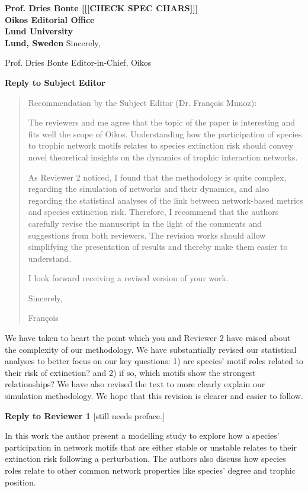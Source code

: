 \documentclass[12pt]{letter}
\begin{document}
\begin{letter}{\bf Prof. Dries Bonte [[[CHECK SPEC CHARS]]]\\
Oikos Editorial Office \\
Lund University \\
Lund, Sweden}
Sincerely,

Prof. Dries Bonte
Editor-in-Chief, Oikos




\clearpage

\Large{\textbf{Reply to Subject Editor}}

    
    \begin{quotation}    
  Recommendation by the Subject Editor (Dr. François Munoz):

  The reviewers and me agree that the topic of the paper is interesting and fits well the scope of Oikos.
  Understanding how the participation of species to trophic network motifs relates to species extinction risk should convey novel theoretical insights on the dynamics of trophic interaction networks.

  As Reviewer 2 noticed, I found that the methodology is quite complex, regarding the simulation of networks and their dynamics, and also regarding the statistical analyses of the link between network-based metrics and species extinction risk.
  Therefore, I recommend that the authors carefully revise the manuscript in the light of the comments and suggestions from both reviewers. The revision works should allow simplifying the presentation of results and thereby make them easier to understand.

  I look forward receiving a revised version of your work.

  Sincerely,

  François
  \end{quotation}
  
  We have taken to heart the point which you and Reviewer 2 have raised about the complexity of our methodology. We have substantially revised our statistical analyses to better focus on our key questions: 1) are species' motif roles related to their risk of extinction? and 2) if so, which motifs show the strongest relationships? We have also revised the text to more clearly explain our simulation methodology. We hope that this revision is clearer and easier to follow.

\clearpage

\Large{\textbf{Reply to Reviewer 1}} [still needs preface.]

  In this work the author present a modelling study to explore how a species' participation in network motifs that are either stable or unstable relates to their extinction risk following a perturbation. The authors also discuss how species roles relate to other common network properties like species' degree and trophic position. 


\end{letter}
\end{document}
